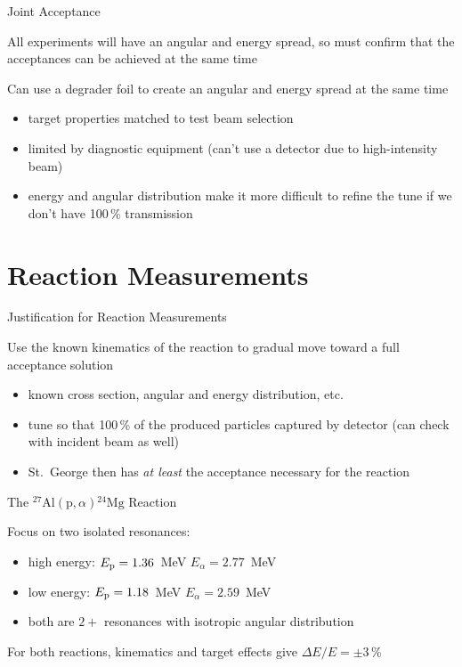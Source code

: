 \documentclass[10pt]{beamer}
\newcommand{\mnuc}[2]{{}^{#1}\textrm{#2}}
\newcommand{\react}[4]{$#1(#2,#3)#4$}
\newcommand{\alpa}{\react{\mnuc{27}{Al}}{\textrm{p}}{\alpha}{\mnuc{24}{Mg}}}
\begin{document}
\begin{frame}[fragile]{Joint Acceptance}

    All experiments will have an angular and energy spread, so must
    confirm that the acceptances can be achieved at the same time

    Can use a degrader foil to create an angular and energy spread at the same time
    \begin{itemize}
        \item target properties matched to test beam selection
        \item limited by diagnostic equipment (can't use a detector due to high-intensity beam)
        \item energy and angular distribution make it more difficult to refine the tune if we don't have 100\,\% transmission
    \end{itemize}

\end{frame}

\section{Reaction Measurements}

\begin{frame}[fragile]{Justification for Reaction Measurements}

    Use the known kinematics of the reaction to gradual move toward a full acceptance solution
    \begin{itemize}
        \item known cross section, angular and energy distribution, etc.
        \item tune so that 100\,\% of the produced particles captured by detector (can check with incident beam as well)
        \item St.\ George then has \textit{at least} the acceptance necessary for the reaction
    \end{itemize}

\end{frame}

\begin{frame}[fragile]{The \alpa{} Reaction}

    Focus on two isolated resonances:
    \begin{itemize}
        \item high energy: $E_{\rm p} = 1.36$~MeV \textrightarrow{} $E_{\alpha} = 2.77$~MeV
        \item low energy: $E_{\rm p} = 1.18$~MeV \textrightarrow{} $E_{\alpha} = 2.59$~MeV
        \item both are $2+$ resonances with isotropic angular distribution
    \end{itemize}

    For both reactions, kinematics and target effects give $\Delta E/E = \pm 3$\,\%

\end{frame}
\end{document}
